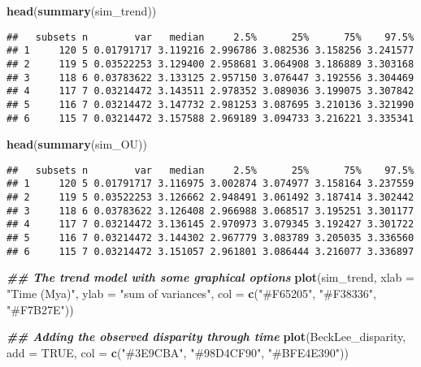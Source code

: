 \documentclass[
]{book}
\newenvironment{Shaded}{\begin{snugshade}}{\end{snugshade}}
\newcommand{\AttributeTok}[1]{\textcolor[rgb]{0.13,0.29,0.53}{#1}}
\newcommand{\ConstantTok}[1]{\textcolor[rgb]{0.56,0.35,0.01}{#1}}
\newcommand{\DocumentationTok}[1]{\textcolor[rgb]{0.56,0.35,0.01}{\textbf{\textit{#1}}}}
\newcommand{\FunctionTok}[1]{\textcolor[rgb]{0.13,0.29,0.53}{\textbf{#1}}}
\newcommand{\NormalTok}[1]{#1}
\newcommand{\StringTok}[1]{\textcolor[rgb]{0.31,0.60,0.02}{#1}}
\begin{document}
\begin{Shaded}
\begin{Highlighting}[]
\FunctionTok{head}\NormalTok{(}\FunctionTok{summary}\NormalTok{(sim\_trend))}
\end{Highlighting}
\end{Shaded}

\begin{verbatim}
##   subsets n        var   median     2.5%      25%      75%    97.5%
## 1     120 5 0.01791717 3.119216 2.996786 3.082536 3.158256 3.241577
## 2     119 5 0.03522253 3.129400 2.958681 3.064908 3.186889 3.303168
## 3     118 6 0.03783622 3.133125 2.957150 3.076447 3.192556 3.304469
## 4     117 7 0.03214472 3.143511 2.978352 3.089036 3.199075 3.307842
## 5     116 7 0.03214472 3.147732 2.981253 3.087695 3.210136 3.321990
## 6     115 7 0.03214472 3.157588 2.969189 3.094733 3.216221 3.335341
\end{verbatim}

\begin{Shaded}
\begin{Highlighting}[]
\FunctionTok{head}\NormalTok{(}\FunctionTok{summary}\NormalTok{(sim\_OU))}
\end{Highlighting}
\end{Shaded}

\begin{verbatim}
##   subsets n        var   median     2.5%      25%      75%    97.5%
## 1     120 5 0.01791717 3.116975 3.002874 3.074977 3.158164 3.237559
## 2     119 5 0.03522253 3.126662 2.948491 3.061492 3.187414 3.302442
## 3     118 6 0.03783622 3.126408 2.966988 3.068517 3.195251 3.301177
## 4     117 7 0.03214472 3.136145 2.970973 3.079345 3.192427 3.301722
## 5     116 7 0.03214472 3.144302 2.967779 3.083789 3.205035 3.336560
## 6     115 7 0.03214472 3.151057 2.961801 3.086444 3.216077 3.336897
\end{verbatim}

\begin{Shaded}
\begin{Highlighting}[]
\DocumentationTok{\#\# The trend model with some graphical options}
\FunctionTok{plot}\NormalTok{(sim\_trend, }\AttributeTok{xlab =} \StringTok{"Time (Mya)"}\NormalTok{, }\AttributeTok{ylab =} \StringTok{"sum of variances"}\NormalTok{,}
    \AttributeTok{col =} \FunctionTok{c}\NormalTok{(}\StringTok{"\#F65205"}\NormalTok{, }\StringTok{"\#F38336"}\NormalTok{, }\StringTok{"\#F7B27E"}\NormalTok{))}

\DocumentationTok{\#\# Adding the observed disparity through time}
\FunctionTok{plot}\NormalTok{(BeckLee\_disparity, }\AttributeTok{add =} \ConstantTok{TRUE}\NormalTok{, }\AttributeTok{col =} \FunctionTok{c}\NormalTok{(}\StringTok{"\#3E9CBA"}\NormalTok{, }\StringTok{"\#98D4CF90"}\NormalTok{, }\StringTok{"\#BFE4E390"}\NormalTok{))}
\end{Highlighting}
\end{Shaded}
\end{document}
